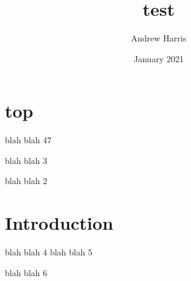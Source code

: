 \documentclass{article}
\title{test}
\author{Andrew Harris}
\date{January 2021}
\begin{document}
\maketitle
\section{top} 
blah blah 47

blah blah 3

blah blah 2

\section{Introduction}
blah blah 4
blah blah 5

blah blah 6
\end{document}
